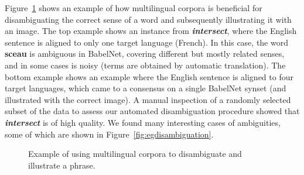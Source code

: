 \documentclass[twocolumn]{svjour3}          \smartqed  \usepackage{graphicx}
\begin{document}
Figure~\ref{fig:examplecleaning} shows an example of how multilingual corpora is beneficial for disambiguating the correct sense of a word and subsequently illustrating it with an image. The top example shows an instance from \textbf{\emph{intersect}},
where the English sentence is aligned to only one target language (French). In this case, the word \textbf{sceau} is ambiguous in BabelNet, covering different but mostly related senses, and in some cases is noisy (terms are obtained by automatic translation). The bottom example shows an example where the English sentence is aligned to four target languages, which came to a consensus on a single BabelNet synset (and illustrated with the correct image).
A manual inspection of a randomly selected subset of the data to assess our automated disambiguation procedure showed that \textbf{\emph{intersect}} is of high quality. We found many interesting cases of ambiguities, some of which are shown in Figure~\ref{fig:egdisambiguation}. 







\begin{figure}
\centering
{}
\caption{Example of using multilingual corpora to disambiguate and illustrate a phrase.}
\label{fig:examplecleaning}
\end{figure}
\end{document}

